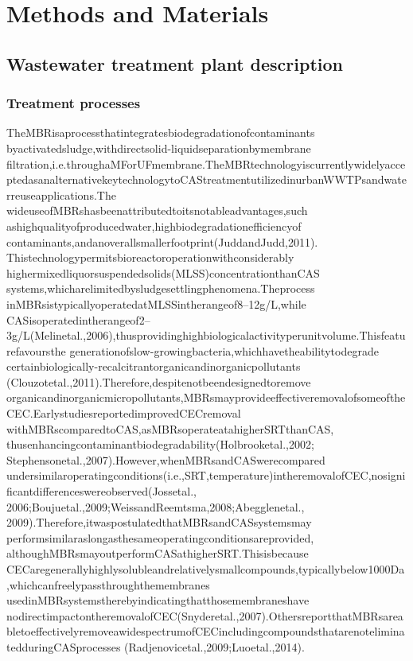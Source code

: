 \chapter{Methods and Materials}
\section{Wastewater treatment plant description}
\subsection{Treatment processes}

TheMBRisaprocessthatintegratesbiodegradationofcontaminants byactivatedsludge,withdirectsolid-liquidseparationbymembrane filtration,i.e.throughaMForUFmembrane.TheMBRtechnologyiscurrentlywidelyacceptedasanalternativekeytechnologytoCAStreatmentutilizedinurbanWWTPsandwaterreuseapplications.The wideuseofMBRshasbeenattributedtoitsnotableadvantages,such ashighqualityofproducedwater,highbiodegradationefficiencyof contaminants,andanoverallsmallerfootprint(JuddandJudd,2011). Thistechnologypermitsbioreactoroperationwithconsiderably highermixedliquorsuspendedsolids(MLSS)concentrationthanCAS systems,whicharelimitedbysludgesettlingphenomena.Theprocess inMBRsistypicallyoperatedatMLSSintherangeof8–12g/L,while CASisoperatedintherangeof2–3g/L(Melinetal.,2006),thusprovidinghighbiologicalactivityperunitvolume.Thisfeaturefavoursthe generationofslow-growingbacteria,whichhavetheabilitytodegrade certainbiologically-recalcitrantorganicandinorganicpollutants (Clouzotetal.,2011).Therefore,despitenotbeendesignedtoremove organicandinorganicmicropollutants,MBRsmayprovideeffectiveremovalofsomeoftheCEC.EarlystudiesreportedimprovedCECremoval withMBRscomparedtoCAS,asMBRsoperateatahigherSRTthanCAS, thusenhancingcontaminantbiodegradability(Holbrooketal.,2002; Stephensonetal.,2007).However,whenMBRsandCASwerecompared undersimilaroperatingconditions(i.e.,SRT,temperature)intheremovalofCEC,nosignificantdifferenceswereobserved(Jossetal., 2006;Boujuetal.,2009;WeissandReemtsma,2008;Abegglenetal., 2009).Therefore,itwaspostulatedthatMBRsandCASsystemsmay performsimilaraslongasthesameoperatingconditionsareprovided, althoughMBRsmayoutperformCASathigherSRT.Thisisbecause CECaregenerallyhighlysolubleandrelativelysmallcompounds,typicallybelow1000Da,whichcanfreelypassthroughthemembranes usedinMBRsystemstherebyindicatingthatthosemembraneshave nodirectimpactontheremovalofCEC(Snyderetal.,2007).OthersreportthatMBRsareabletoeffectivelyremoveawidespectrumofCECincludingcompoundsthatarenoteliminatedduringCASprocesses (Radjenovicetal.,2009;Luoetal.,2014).\citep{krzeminskiPerformanceSecondaryWastewater2019}
